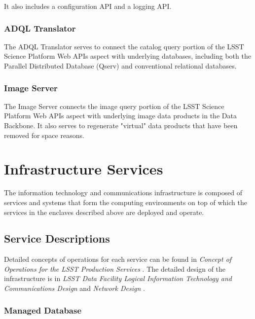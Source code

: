 \documentclass[DM,toc,lsstdraft]{lsstdoc}
\begin{document}
It also includes a configuration API and a logging API.

\subsubsection{ADQL Translator}\label{adql-translator}

The ADQL Translator serves to connect the catalog query portion of the LSST Science Platform Web APIs aspect with underlying databases, including both the Parallel Distributed Database (Qserv) and conventional relational databases.

\subsubsection{Image Server}\label{image-server}

The Image Server connects the image query portion of the LSST Science Platform Web APIs aspect with underlying image data products in the Data Backbone.
It also serves to regenerate "virtual" data products that have been removed for space reasons.


\section{Infrastructure Services}\label{infrastructure-services}

The information technology and communications infrastructure is composed of services and systems that form the computing environments on top of which the services in the enclaves described above are deployed and operate.

\subsection{Service Descriptions}\label{infrastructure-service-descriptions}

Detailed concepts of operations for each service can be found in \textit{Concept of Operations for the LSST Production Services} .
The detailed design of the infrastructure is in \textit{LSST Data Facility Logical Information Technology and Communications Design}  and \textit{Network Design} .

\subsubsection{Managed Database}\label{managed-database}
\end{document}

